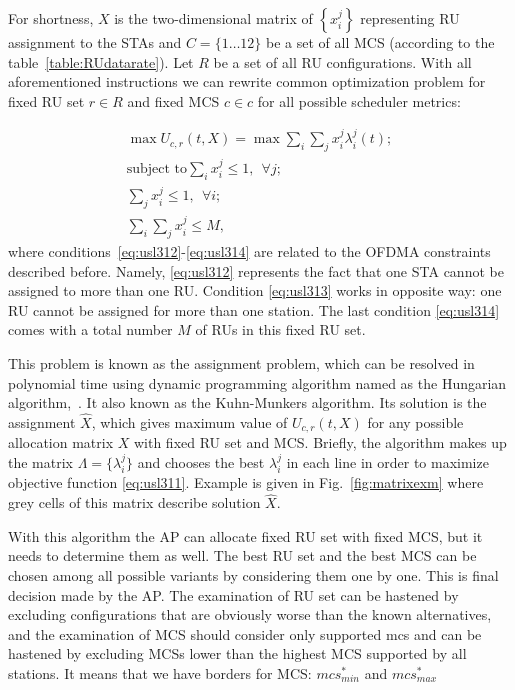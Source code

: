 For shortness, $X$ is the two-dimensional matrix of $\left\{x_i^j\right\}$ representing RU assignment to the STAs and $C = \{1\dots12\}$ be a set of all MCS (according to the table~\ref{table:RUdatarate}). Let $R$ be a set of all RU configurations. With all aforementioned instructions we can rewrite common optimization problem for fixed RU set $r \in R$ and fixed MCS $c \in c$ for all possible scheduler metrics:

\begin{align} \label{eq:usl311}
\max U_{c, r}(t,X) = \max \sum_{i} \sum_{j} x_i^j \lambda_i^j(t); \\ \label{eq:usl312}
\text{subject to} \sum_{i} x_i^j \leq 1,\ \  \forall j; \\ \label{eq:usl313}
\sum_{j} x_i^j \leq 1, \ \ \forall i; \\ \label{eq:usl314}
\sum_{i} \sum_{j} x_i^j \leq M,
\end{align}
where conditions~\eqref{eq:usl312}-\eqref{eq:usl314} are related to the OFDMA  constraints described before. 
Namely, \eqref{eq:usl312} represents the fact that one STA cannot be assigned to more than one RU. Condition \eqref{eq:usl313} works in opposite way: one RU cannot be assigned for more than one station. The last condition \eqref{eq:usl314} comes with a total number $M$ of RUs in this fixed RU set.

This problem is known as the assignment problem, which can be resolved in polynomial time using dynamic programming algorithm named as the Hungarian algorithm,~\cite{bourgeois1971extension}.
It also known as the Kuhn-Munkers algorithm. 
Its solution is the assignment $\hat X$, which gives maximum value of $U_{c, r}(t,X)$  for any possible allocation matrix $X$ with fixed RU set and MCS. 
Briefly, the algorithm makes up the matrix $\Lambda = \{\lambda_i^j\}$ and chooses the best $\lambda_i^j$ in each line in order to maximize objective function \ref{eq:usl311}. Example is given in Fig.~\ref{fig:matrixexm} where grey cells of this matrix describe solution $\hat X$. 

With this algorithm the AP can allocate fixed RU set with fixed MCS, but it needs to determine them as well. The best RU set and the best MCS can be chosen among all possible variants by considering them one by one. This is final decision made by the AP. 
The examination of RU set can be hastened by excluding configurations that are obviously worse than the known alternatives, and the examination of MCS should consider only supported mcs and can be hastened by excluding MCSs lower than the highest MCS supported by all stations. It means that we have borders for MCS: $mcs^{*}_{min}$ and $mcs^{*}_{max}$

